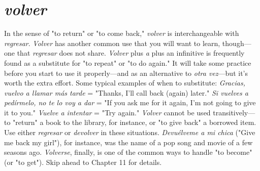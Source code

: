 \section{\emph{volver}}

In the sense of "to return" or "to come back," \emph{volver} is interchangeable with \emph{regresar}. \emph{Volver} has another common use that you
will want to learn, though---one that \emph{regresar} does not share. \emph{Volver}
plus \emph{a} plus an infinitive is frequently found as a substitute for "to repeat" or "to do again." It will take some practice before you start to
use it properly---and as an alternative to \emph{otra vez}---but it's worth the
extra effort. Some typical examples of when to substitute: \emph{Gracias,
vuelvo a llamar más tarde} = "Thanks, I'll call back (again) later." \emph{Si
vuelves a pedírmelo, no te lo voy a dar} = "If you ask me for it again,
I'm not going to give it to you." \emph{Vuelve a intentar} = "Try again."
\emph{Volver} cannot be used transitively---to "return" a book to the library, for
instance, or "to give back" a borrowed item. Use either \emph{regresar} or \emph{devolver} in these situations. \emph{Devuélveme a mi chica} ("Give me back my
girl"), for instance, was the name of a pop song and movie of a few seasons ago. \emph{Volverse}, finally, is one of the common ways to handle "to
become" (or "to get"). Skip ahead to Chapter 11 for details.

